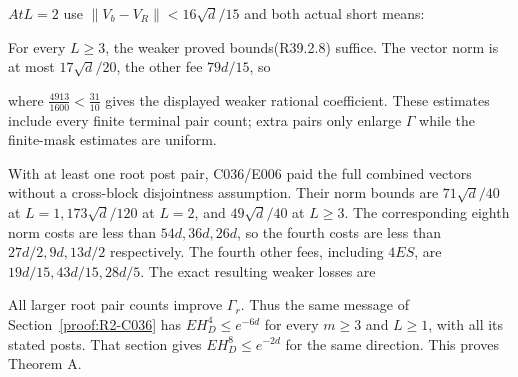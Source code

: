 
\(At L=2\) use \(\lVert V_b-V_R\rVert <16\sqrt{d}/15\) and both actual short means:


For every \(L\ge 3\), the weaker proved bounds(R39.2.8) suffice. The vector norm is at most \(17\sqrt{d}/20\), the other fee \(79d/15\), so


where \(\frac{4913}{1600}<\frac{31}{10}\) gives the displayed weaker rational coefficient. These estimates include every finite terminal pair count; extra pairs only enlarge \(\Gamma\) while the finite-mask estimates are uniform.

With at least one root post pair, C036/E006 paid the full combined vectors without a cross-block disjointness assumption. Their norm bounds are \(71\sqrt{d}/40\) at \(L=1,\allowbreak \allowbreak 173\sqrt{d}/120\) at \(L=2\), and \(49\sqrt{d}/40\) at \(L\ge 3\). The corresponding eighth norm costs are less than \(54d,\allowbreak \allowbreak 36d,\allowbreak \allowbreak  26d\), so the fourth costs are less than \(27d/2,\allowbreak \allowbreak 9d,\allowbreak \allowbreak 13d/2\) respectively. The fourth other fees, including \(4ES\), are \(19d/15,\allowbreak \allowbreak 43d/15,\allowbreak \allowbreak 28d/5\). The exact resulting weaker losses are




All larger root pair counts improve \(\Gamma_r\). Thus the same
message of Section~\ref{proof:R2-C036} has
\(EH_D^4\le e^{-6d}\) for every \(m\ge3\) and \(L\ge1\), with
all its stated posts. That section gives \(EH_D^8\le e^{-2d}\) for
the same direction. This proves Theorem A.

